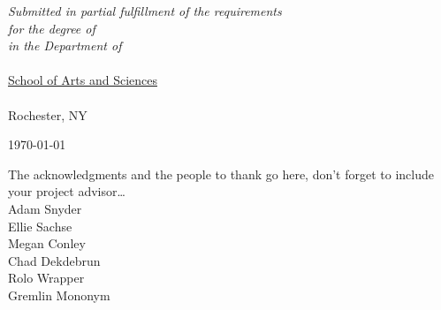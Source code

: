 \documentclass[
11pt, %
english, %
doublespacing, %
nolistspacing, %
headsepline, %
]{MastersDoctoralThesis} %
\begin{document}
\begin{titlepage}
\begin{singlespace}
\begin{center}
\vfill

\large \textit{Submitted in partial fulfillment of the requirements\\ for the degree of \degreename}\\[0.3cm] %
\textit{in the Department of}\\[0.4cm]
\deptname\\{\href{https://www.sas.rochester.edu/}{School of Arts and Sciences}}\\\univname\\{Rochester, NY} %
 
\vfill

{\large \today}\\[4cm] %

 
\vfill
\end{center}
\end{singlespace}
\end{titlepage}






{
\hypersetup{hidelinks}
\tableofcontents %
}






\begin{acknowledgements}
	\addchaptertocentry{\acknowledgementname} %
	The acknowledgments and the people to thank go here, don't forget to include your project advisor\ldots \\
	Adam Snyder \\
	Ellie Sachse \\
	Megan Conley \\
	Chad Dekdebrun \\
	Rolo Wrapper \\
	Gremlin Mononym \\
\end{acknowledgements}
\end{document}
